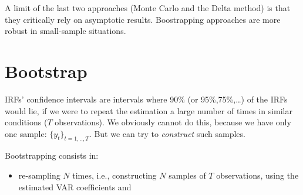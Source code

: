 \documentclass[
  12pt,
]{book}
\newenvironment{Shaded}{\begin{snugshade}}{\end{snugshade}}
\newcommand{\ConstantTok}[1]{\textcolor[rgb]{0.00,0.00,0.00}{#1}}
\newcommand{\ControlFlowTok}[1]{\textcolor[rgb]{0.13,0.29,0.53}{\textbf{#1}}}
\newcommand{\DecValTok}[1]{\textcolor[rgb]{0.00,0.00,0.81}{#1}}
\newcommand{\FloatTok}[1]{\textcolor[rgb]{0.00,0.00,0.81}{#1}}
\newcommand{\FunctionTok}[1]{\textcolor[rgb]{0.00,0.00,0.00}{#1}}
\newcommand{\NormalTok}[1]{#1}
\newcommand{\OtherTok}[1]{\textcolor[rgb]{0.56,0.35,0.01}{#1}}
\newcommand{\SpecialCharTok}[1]{\textcolor[rgb]{0.00,0.00,0.00}{#1}}
\providecommand{\tightlist}{%
  \setlength{\itemsep}{0pt}\setlength{\parskip}{0pt}}
\theoremstyle{definition}
\theoremstyle{definition}
\theoremstyle{definition}
\theoremstyle{definition}
\theoremstyle{remark}
\begin{document}
\begin{Shaded}
\end{Shaded}

A limit of the last two approaches (Monte Carlo and the Delta method) is that they critically rely on asymptotic results. Boostrapping approaches are more robust in small-sample situations.

\hypertarget{bootstrap}{%
\section{Bootstrap}\label{bootstrap}}

IRFs' confidence intervals are intervals where 90\% (or 95\%,75\%,\ldots) of the IRFs would lie, if we were to repeat the estimation a large number of times in similar conditions (\(T\) observations). We obviously cannot do this, because we have only one sample: \(\{y_t\}_{t=1,..,T}\). But we can try to \emph{construct} such samples.

Bootstrapping consists in:

\begin{itemize}
\tightlist
\item
  re-sampling \(N\) times, i.e., constructing \(N\) samples of \(T\) observations, using the estimated
  VAR coefficients and
\end{itemize}
\end{document}
